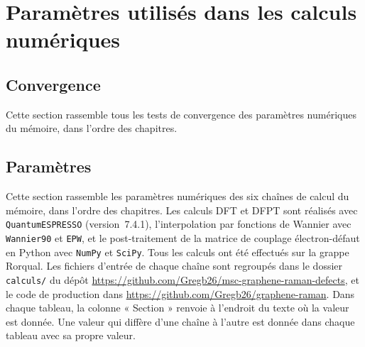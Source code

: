 \chapter{Paramètres utilisés dans les calculs numériques}\label{annexe:paramètres}

\section{Convergence}

Cette section rassemble tous les tests de convergence des paramètres numériques du mémoire, dans l'ordre des chapitres.

\section{Paramètres}

Cette section rassemble les paramètres numériques des six chaînes de calcul du mémoire, dans l'ordre des chapitres. Les calculs DFT et DFPT sont réalisés avec \texttt{QuantumESPRESSO} (version~7.4.1), l'interpolation par fonctions de Wannier avec \texttt{Wannier90} et \texttt{EPW}, et le post-traitement de la matrice de couplage électron-défaut en Python avec \texttt{NumPy} et \texttt{SciPy}.
Tous les calculs ont été effectués sur la grappe Rorqual. Les fichiers d'entrée de chaque chaîne sont regroupés dans le dossier \texttt{calculs/} du dépôt \url{https://github.com/Gregb26/msc-graphene-raman-defects}, et le code de production dans \url{https://github.com/Gregb26/graphene-raman}.
Dans chaque tableau, la colonne « Section » renvoie à l'endroit du texte où la valeur est donnée. Une valeur qui diffère d'une chaîne à l'autre est donnée dans chaque tableau avec sa propre valeur.

